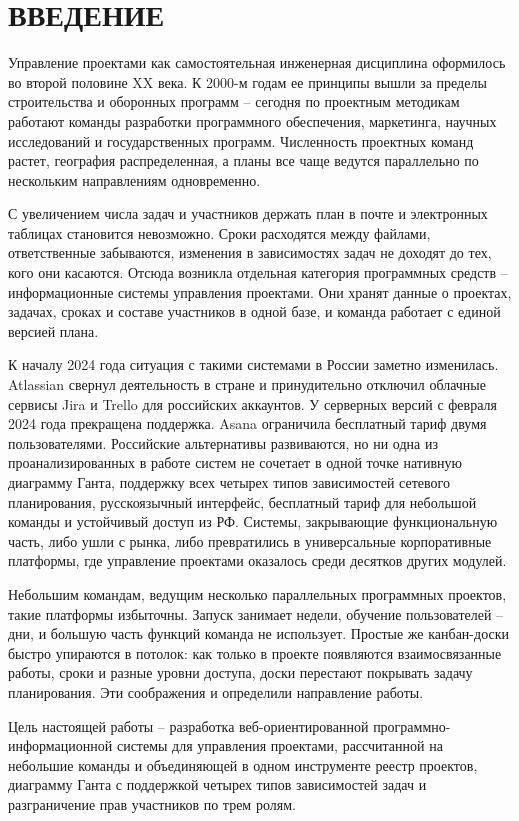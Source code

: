 \section*{ВВЕДЕНИЕ}

Управление проектами как самостоятельная инженерная дисциплина оформилось во второй половине XX века. К 2000-м годам ее принципы вышли за пределы строительства и оборонных программ -- сегодня по проектным методикам работают команды разработки программного обеспечения, маркетинга, научных исследований и государственных программ. Численность проектных команд растет, география распределенная, а планы все чаще ведутся параллельно по нескольким направлениям одновременно.

С увеличением числа задач и участников держать план в почте и электронных таблицах становится невозможно. Сроки расходятся между файлами, ответственные забываются, изменения в зависимостях задач не доходят до тех, кого они касаются. Отсюда возникла отдельная категория программных средств -- информационные системы управления проектами. Они хранят данные о проектах, задачах, сроках и составе участников в одной базе, и команда работает с единой версией плана.

К началу 2024 года ситуация с такими системами в России заметно изменилась. Atlassian свернул деятельность в стране и принудительно отключил облачные сервисы Jira и Trello для российских аккаунтов. У серверных версий с февраля 2024 года прекращена поддержка. Asana ограничила бесплатный тариф двумя пользователями. Российские альтернативы развиваются, но ни одна из проанализированных в работе систем не сочетает в одной точке нативную диаграмму Ганта, поддержку всех четырех типов зависимостей сетевого планирования, русскоязычный интерфейс, бесплатный тариф для небольшой команды и устойчивый доступ из РФ. Системы, закрывающие функциональную часть, либо ушли с рынка, либо превратились в универсальные корпоративные платформы, где управление проектами оказалось среди десятков других модулей.

Небольшим командам, ведущим несколько параллельных программных проектов, такие платформы избыточны. Запуск занимает недели, обучение пользователей -- дни, и большую часть функций команда не использует. Простые же канбан-доски быстро упираются в потолок: как только в проекте появляются взаимосвязанные работы, сроки и разные уровни доступа, доски перестают покрывать задачу планирования. Эти соображения и определили направление работы.

Цель настоящей работы -- разработка веб-ориентированной программно-информационной системы для управления проектами, рассчитанной на небольшие команды и объединяющей в одном инструменте реестр проектов, диаграмму Ганта с поддержкой четырех типов зависимостей задач и разграничение прав участников по трем ролям.

